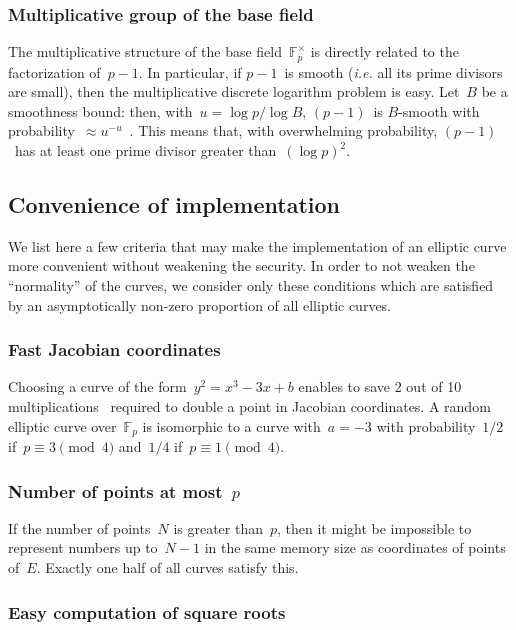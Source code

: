 \documentclass{article}
\def\F{\mathbb{F}}
\begin{document}
\subsubsection{Multiplicative group of the base field}

The multiplicative structure of the base field~$\F_p^{×}$
is directly related to the factorization of~$p-1$.
In particular, if $p-1$~is smooth
(\emph{i.e.} all its prime divisors are small),
then the multiplicative discrete logarithm problem is easy.
Let~$B$ be a smoothness bound: then, with~$u = \log p / \log B$,
$(p-1)$~is $B$-smooth with probability~$≈ u^{-u}$~\cite{jnt1983cep}.
This means that, with overwhelming probability,
$(p-1)$~has at least one prime divisor greater than~$(\log p)^2$.

\subsection{Convenience of implementation}
\label{ss:convenience}

We list here a few criteria that
may make the implementation of an elliptic curve more convenient
without weakening the security.
In order to not weaken the ``normality'' of the curves,
we consider only these conditions which are satisfied
by an asymptotically non-zero proportion of all elliptic curves.

\subsubsection{Fast Jacobian coordinates}

Choosing a curve of the form~$y^2 = x^3 - 3 x + b$
enables to save 2 out of 10 multiplications~\cite{ieeep1363}
required to double a point in Jacobian coordinates.
A random elliptic curve over~$\F_p$
is isomorphic to a curve with~$a = -3$
with probability~$1/2$ if~$p ≡ 3 \pmod{4}$ and~$1/4$ if~$p ≡ 1 \pmod{4}$.

\subsubsection{Number of points at most~$p$}

If the number of points~$N$ is greater than~$p$,
then it might be impossible to represent numbers up to~$N-1$
in the same memory size as coordinates of points of~$E$.
Exactly one half of all curves satisfy this.

\subsubsection{Easy computation of square roots}
\end{document}
